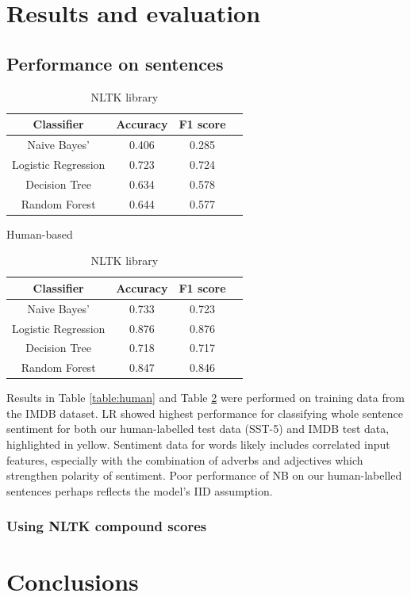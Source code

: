 \documentclass[10pt, a4paper]{article}
\begin{document}
\section{Results and evaluation}
\subsection{Performance on sentences}

\begin{table}
\parbox{.45\linewidth}{
\centering
\begin{tabular}{||c c c c||} 
 \hline
 Classifier & Accuracy & F1 score &\\ [0.5ex] 
 \hline\hline
 Naive Bayes' & 0.406 & 0.285 &\\ 
 \hline 
 Logistic Regression & \cellcolor{yellow!25}0.723 & 0.724 &\\
 \hline
 Decision Tree & 0.634 & 0.578 &\\
 \hline
 Random Forest & 0.644 & 0.577  &\\
 \hline\hline
\end{tabular}
\caption{Human-based}
\label{table:human}
}

\parbox{0.45\linewidth}{
\centering
\begin{tabular}{||c c c c||} 
 \hline
 Classifier & Accuracy & F1 score &\\ [0.5ex] 
 \hline\hline
 Naive Bayes' & 0.733 & 0.723 &\\ 
 \hline 
 Logistic Regression & \cellcolor{yellow!25}0.876 & 0.876 &\\
 \hline
 Decision Tree & 0.718 & 0.717 &\\
 \hline
 Random Forest & 0.847 & 0.846  &\\
 \hline\hline
\end{tabular}
\caption{NLTK library}
\label{table:nltk}
}
\end{table}

Results in Table \ref{table:human} and Table \ref{table:nltk} were performed on training data from the IMDB dataset. LR showed highest performance for classifying whole sentence sentiment for both our human-labelled test data (SST-5) and IMDB test data, highlighted in yellow. Sentiment data for words likely includes correlated input features, especially with the combination of adverbs and adjectives which strengthen polarity of sentiment. Poor performance of NB on our human-labelled sentences perhaps reflects the model's IID assumption.






\subsubsection{Using NLTK compound scores}


\section{Conclusions}





\end{document}
